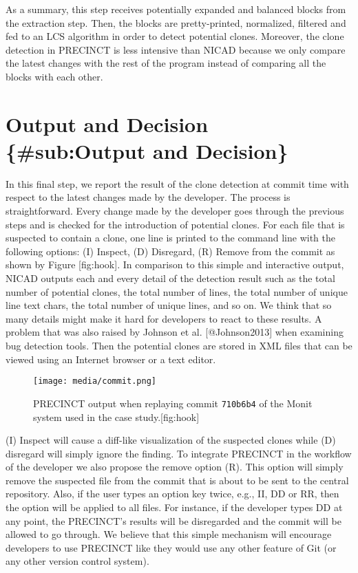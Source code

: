 As a summary, this step receives potentially expanded and balanced
blocks from the extraction step. Then, the blocks are pretty-printed,
normalized, filtered and fed to an LCS algorithm in order to detect
potential clones. Moreover, the clone detection in PRECINCT is less
intensive than NICAD because we only compare the latest changes with the
rest of the program instead of comparing all the blocks with each other.

\section{Output and Decision \{\#sub:Output and
Decision\}}\label{output-and-decision-suboutput-and-decision}

In this final step, we report the result of the clone detection at
commit time with respect to the latest changes made by the developer.
The process is straightforward. Every change made by the developer goes
through the previous steps and is checked for the introduction of
potential clones. For each file that is suspected to contain a clone,
one line is printed to the command line with the following options: (I)
Inspect, (D) Disregard, (R) Remove from the commit as shown by Figure
{[}fig:hook{]}. In comparison to this simple and interactive output,
NICAD outputs each and every detail of the detection result such as the
total number of potential clones, the total number of lines, the total
number of unique line text chars, the total number of unique lines, and
so on. We think that so many details might make it hard for developers
to react to these results. A problem that was also raised by Johnson et
al. {[}@Johnson2013{]} when examining bug detection tools. Then the
potential clones are stored in XML files that can be viewed using an
Internet browser or a text editor.

\begin{figure}[htbp]
\centering
\texttt{[image: media/commit.png]}
\caption{PRECINCT output when replaying commit \texttt{710b6b4} of the
Monit system used in the case study.{[}fig:hook{]}}
\end{figure}

(I) Inspect will cause a diff-like visualization of the suspected clones
while (D) disregard will simply ignore the finding. To integrate
PRECINCT in the workflow of the developer we also propose the remove
option (R). This option will simply remove the suspected file from the
commit that is about to be sent to the central repository. Also, if the
user types an option key twice, e.g., II, DD or RR, then the option will
be applied to all files. For instance, if the developer types DD at any
point, the PRECINCT's results will be disregarded and the commit will be
allowed to go through. We believe that this simple mechanism will
encourage developers to use PRECINCT like they would use any other
feature of Git (or any other version control system).


